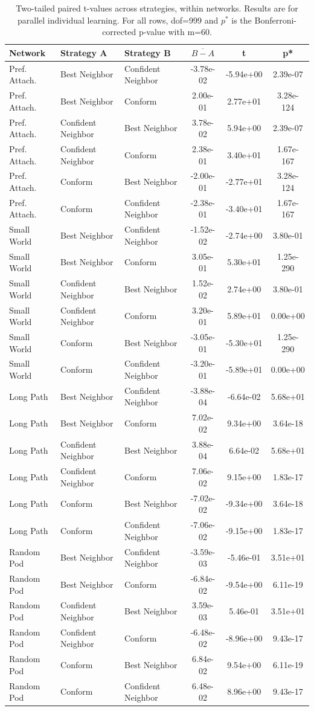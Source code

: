 \begin{table}[]
    \label{tab:t-innet-parallel}
    \centering
    \begin{tabular}{l|ll|ccc}
        Network & Strategy A & Strategy B & $\overline{B - A}$ & t & p* \\
    \hline
Pref. Attach.&Best Neighbor&Confident Neighbor&-3.78e-02&-5.94e+00&2.39e-07\\
Pref. Attach.&Best Neighbor&Conform&2.00e-01&2.77e+01&3.28e-124\\
Pref. Attach.&Confident Neighbor&Best Neighbor&3.78e-02&5.94e+00&2.39e-07\\
Pref. Attach.&Confident Neighbor&Conform&2.38e-01&3.40e+01&1.67e-167\\
Pref. Attach.&Conform&Best Neighbor&-2.00e-01&-2.77e+01&3.28e-124\\
Pref. Attach.&Conform&Confident Neighbor&-2.38e-01&-3.40e+01&1.67e-167\\
\hline
Small World&Best Neighbor&Confident Neighbor&-1.52e-02&-2.74e+00&3.80e-01\\
Small World&Best Neighbor&Conform&3.05e-01&5.30e+01&1.25e-290\\
Small World&Confident Neighbor&Best Neighbor&1.52e-02&2.74e+00&3.80e-01\\
Small World&Confident Neighbor&Conform&3.20e-01&5.89e+01&0.00e+00\\
Small World&Conform&Best Neighbor&-3.05e-01&-5.30e+01&1.25e-290\\
Small World&Conform&Confident Neighbor&-3.20e-01&-5.89e+01&0.00e+00\\
\hline
Long Path&Best Neighbor&Confident Neighbor&-3.88e-04&-6.64e-02&5.68e+01\\
Long Path&Best Neighbor&Conform&7.02e-02&9.34e+00&3.64e-18\\
Long Path&Confident Neighbor&Best Neighbor&3.88e-04&6.64e-02&5.68e+01\\
Long Path&Confident Neighbor&Conform&7.06e-02&9.15e+00&1.83e-17\\
Long Path&Conform&Best Neighbor&-7.02e-02&-9.34e+00&3.64e-18\\
Long Path&Conform&Confident Neighbor&-7.06e-02&-9.15e+00&1.83e-17\\
\hline
Random Pod&Best Neighbor&Confident Neighbor&-3.59e-03&-5.46e-01&3.51e+01\\
Random Pod&Best Neighbor&Conform&-6.84e-02&-9.54e+00&6.11e-19\\
Random Pod&Confident Neighbor&Best Neighbor&3.59e-03&5.46e-01&3.51e+01\\
Random Pod&Confident Neighbor&Conform&-6.48e-02&-8.96e+00&9.43e-17\\
Random Pod&Conform&Best Neighbor&6.84e-02&9.54e+00&6.11e-19\\
Random Pod&Conform&Confident Neighbor&6.48e-02&8.96e+00&9.43e-17\\
    \hline
    \end{tabular}
    \caption{Two-tailed paired t-values across strategies, within networks. Results are for parallel individual learning. For all rows, dof=999 and $p^*$ is the Bonferroni-corrected p-value with m=60.}
\end{table}


